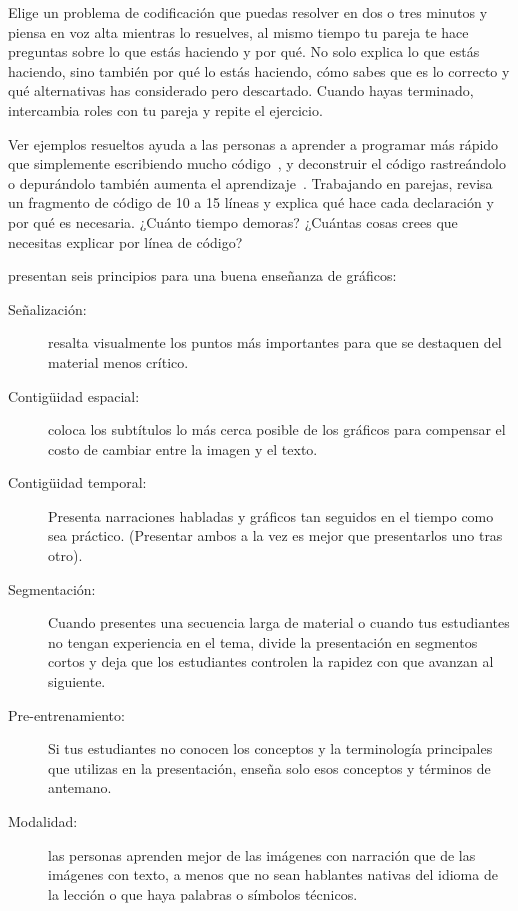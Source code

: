 Elige un problema de codificación que puedas resolver en dos o tres minutos
y piensa en voz alta mientras lo resuelves,
al mismo tiempo tu pareja te hace preguntas sobre lo que estás haciendo y por qué.
No solo explica lo que estás haciendo,
sino también por qué lo estás haciendo,
cómo sabes que es lo correcto y qué alternativas has considerado pero descartado.
Cuando hayas terminado,
intercambia roles con tu pareja y repite el ejercicio.



Ver ejemplos resueltos ayuda a las personas a aprender a programar más rápido que simplemente escribiendo mucho código~\cite{Skud2014},
y deconstruir el código rastreándolo o depurándolo también aumenta el aprendizaje~\cite{Grif2016}.
Trabajando en parejas, revisa un fragmento de código de 10 a 15 líneas
y explica qué hace cada declaración y por qué es necesaria.
¿Cuánto tiempo demoras?
¿Cuántas cosas crees que necesitas explicar por línea de código?


\cite{Maye2009,Mill2016a} presentan seis principios para una buena enseñanza de gráficos:

\begin{description}

\item[Señalización:]
  resalta visualmente los puntos más importantes
  para que se destaquen del material menos crítico.

\item[Contigüidad espacial:]
  coloca los subtítulos lo más cerca posible de los gráficos para compensar el costo de cambiar entre la imagen y el texto.

\item[Contigüidad temporal:]
  Presenta narraciones habladas y gráficos tan seguidos en el tiempo como sea práctico.
  (Presentar ambos a la vez es mejor que presentarlos uno tras otro).

\item[Segmentación:]
  Cuando presentes una secuencia larga de material o
  cuando tus estudiantes no tengan experiencia en el tema,
  divide la presentación en segmentos cortos y deja que los estudiantes controlen la rapidez con que avanzan al siguiente.

\item[Pre-entrenamiento:]
  Si tus estudiantes no conocen los conceptos y la terminología principales que utilizas en la presentación,
  enseña solo esos conceptos y términos de antemano.

\item[Modalidad:]
las personas aprenden mejor de las imágenes con narración que de las imágenes con texto,
a menos que no sean hablantes nativas del idioma de la lección o que haya palabras o símbolos técnicos.

\end{description}


